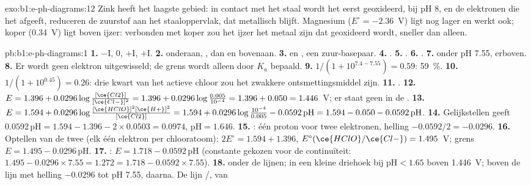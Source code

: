 \begin{solution}{exo:b1:e-ph-diagrams:12}
Zink heeft het laagste gebied: in contact met het staal wordt het eerst
geoxideerd,  bij pH 8, en de elektronen
die het afgeeft, reduceren de zuurstof aan het staaloppervlak, dat
metallisch blijft. Magnesium ($E^\circ = -2.36$~V) ligt nog lager en werkt
ook; koper (0.34~V) ligt boven ijzer: verbonden met koper zou het ijzer
het metaal zijn dat geoxideerd wordt, sneller dan alleen.
\end{solution}

\begin{solution}{pb:b1:e-ph-diagrams:1}
\textbf{1.} $-$I, 0, $+$I, $+$I.
\textbf{2.}  onderaan, , dan  en 
bovenaan.
\textbf{3.}  en , een zuur-basepaar.
\textbf{4.} .
\textbf{5.} .
\textbf{6.} .
\textbf{7.}  onder pH 7.55,  erboven.
\textbf{8.} Er wordt geen elektron uitgewisseld; de grens wordt alleen
door $K_a$ bepaald.
\textbf{9.} $1/(1 + 10^{7.4 - 7.55}) = 0.59$: \qty{59}{\percent}.
\textbf{10.} $1/(1 + 10^{0.45}) = 0.26$: drie kwart van het actieve
chloor zou het zwakkere ontsmettingsmiddel  zijn.
\textbf{11.} .
\textbf{12.} $E = 1.396 + 0.0296\log\frac{[\ce{Cl2}]}{[\ce{Cl-}]^2} = 1.396
+ 0.0296\log\frac{0.005}{10^{-4}} = 1.396 + 0.050 = 1.446$~V; er staat
geen  in de .
\textbf{13.} $E = 1.594 + 0.0296\log\frac{[\ce{HClO}]^2[\ce{H+}]^2}{[\ce{Cl2}]}
= 1.594 + 0.0296\log\frac{10^{-4}}{0.005} - 0.0592\,\mathrm{pH} = 1.594 -
0.050 - 0.0592\,\mathrm{pH}$.
\textbf{14.} Gelijkstellen geeft $0.0592\,\mathrm{pH} = 1.594 - 1.396 - 2 \times 0.0503
= 0.0974$, $\mathrm{pH} = 1.646$.
\textbf{15.} : één proton voor twee
elektronen, helling $-0.0592/2 = -0.0296$.
\textbf{16.} Optellen van de twee  (elk één elektron per
chlooratoom): $2E^\circ = 1.594 + 1.396$, $E^\circ(\ce{HClO}/\ce{Cl-}) =
1.495$~V; grens $E = 1.495 - 0.0296\,\mathrm{pH}$.
\textbf{17.} : $E = 1.718 - 0.0592\,\mathrm{pH}$
(constante gekozen voor de continuïteit: $1.495 - 0.0296 \times 7.55 = 1.272 = 1.718
- 0.0592 \times 7.55$).
\textbf{18.}  onder de lijnen;  in een kleine driehoek bij
$\mathrm{pH} < 1.65$ boven 1.446~V;  boven de lijn met helling
$-0.0296$ tot pH 7.55,  daarna. De lijn /, van

\end{solution}
